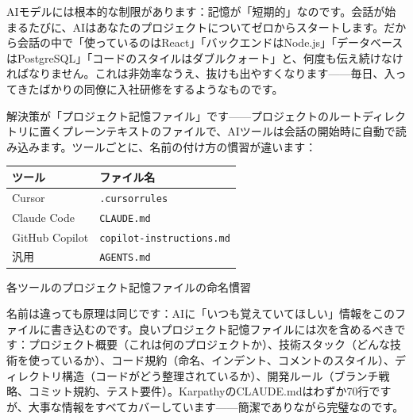 


AIモデルには根本的な制限があります：記憶が「短期的」なのです。会話が始まるたびに、AIはあなたのプロジェクトについてゼロからスタートします。だから会話の中で「使っているのはReact」「バックエンドはNode.js」「データベースはPostgreSQL」「コードのスタイルはダブルクォート」と、何度も伝え続けなければなりません。これは非効率なうえ、抜けも出やすくなります——毎日、入ってきたばかりの同僚に入社研修をするようなものです。

解決策が「プロジェクト記憶ファイル」です——プロジェクトのルートディレクトリに置くプレーンテキストのファイルで、AIツールは会話の開始時に自動で読み込みます。ツールごとに、名前の付け方の慣習が違います：

\begin{center}
\begin{tabularx}{\linewidth}{|X|X|}
\hline
\textbf{ツール} & \textbf{ファイル名} \tabularnewline
\hline
Cursor & \texttt{.\allowbreak cursorrules} \tabularnewline
Claude Code & \texttt{CLAUDE.\allowbreak md} \tabularnewline
GitHub Copilot & \texttt{copilot-\allowbreak instructions.\allowbreak md} \tabularnewline
汎用 & \texttt{AGENTS.\allowbreak md} \tabularnewline
\hline
\end{tabularx}
\end{center}

\begin{center}\small\color{gray}各ツールのプロジェクト記憶ファイルの命名慣習\end{center}

名前は違っても原理は同じです：AIに「いつも覚えていてほしい」情報をこのファイルに書き込むのです。良いプロジェクト記憶ファイルには次を含めるべきです：プロジェクト概要（これは何のプロジェクトか）、技術スタック（どんな技術を使っているか）、コード規約（命名、インデント、コメントのスタイル）、ディレクトリ構造（コードがどう整理されているか）、開発ルール（ブランチ戦略、コミット規約、テスト要件）。KarpathyのCLAUDE.mdはわずか70行ですが、大事な情報をすべてカバーしています——簡潔でありながら完璧なのです。

